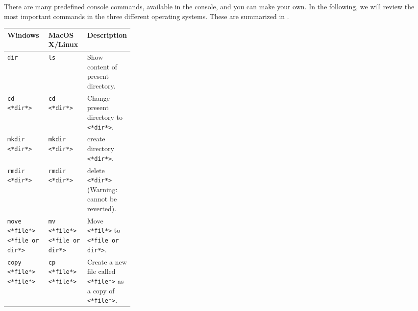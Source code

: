 There are many predefined console commands, available in the console, and you can make your own. In the following, we will review the most important commands in the three different operating systems. These are summarized in .
\begin{table}
  \centering
  \begin{tabular}{|l|l||p{0.3\linewidth}|}
    \hline
    Windows & MacOS X/Linux & Description 
    \\ \hline\hline
    {\lstinline[language=syntax]|dir|}
            & {\lstinline[language=syntax]|ls|}
                            & Show content of present directory.
    \\ \hline
    {\lstinline[language=syntax]|cd <*dir*>|} 
            &{\lstinline[language=syntax]|cd <*dir*>|} 
                          & Change present directory to {\lstinline[language=syntax]|<*dir*>|}. 
    \\ \hline
    {\lstinline[language=syntax]|mkdir <*dir*>|}
            & {\lstinline[language=syntax]|mkdir <*dir*>|}
                          & create directory {\lstinline[language=syntax]|<*dir*>|}. \\ \hline
    {\lstinline[language=syntax]|rmdir <*dir*>|}
            & {\lstinline[language=syntax]|rmdir <*dir*>|}
                          & delete {\lstinline[language=syntax]|<*dir*>|} (Warning: cannot be reverted). \\ \hline
    {\lstinline[language=syntax, keywords={}]|move <*file*> <*file or dir*>|\hspace*{5mm}}%
            &{\lstinline[language=syntax, keywords={}]|mv <*file*> <*file or dir*>|}
                          & Move {\lstinline[language=syntax]|<*fil*>|} to {\lstinline[language=syntax, keywords={}]|<*file or dir*>|}. \\ \hline
    {\lstinline[language=syntax]|copy <*file*> <*file*>|}
            &{\lstinline[language=syntax]|cp <*file*> <*file*>|}
             & Create a new file called {\lstinline[language=syntax]|<*file*>|} as a copy of {\lstinline[language=syntax]|<*file*>|}. \\ \hline

\end{tabular}
\end{table}
